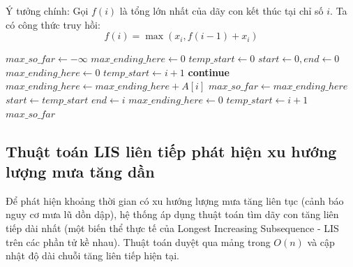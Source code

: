 Ý tưởng chính: Gọi $f(i)$ là tổng lớn nhất của dãy con kết thúc tại chỉ số $i$. Ta có công thức truy hồi:
\begin{equation}
    f(i) = \max(x_i, f(i-1) + x_i)
\end{equation}

\begin{algorithm}[H]
\caption{Thuật toán Kadane tìm đoạn nhiệt độ cao nhất}
\label{alg:kadane}
\begin{algorithmic}[1]
    \State $max\_so\_far \gets -\infty$
    \State $max\_ending\_here \gets 0$
    \State $temp\_start \gets 0$
    \State $start \gets 0, end \gets 0$
            \State $max\_ending\_here \gets 0$
            \State $temp\_start \gets i + 1$
            \State \textbf{continue}
        \EndIf
        \State $max\_ending\_here \gets max\_ending\_here + A[i]$
            \State $max\_so\_far \gets max\_ending\_here$
            \State $start \gets temp\_start$
            \State $end \gets i$
        \EndIf
            \State $max\_ending\_here \gets 0$
            \State $temp\_start \gets i + 1$
        \EndIf
    \EndFor
    \State \Return $max\_so\_far$
\EndProcedure
\end{algorithmic}
\end{algorithm}

\subsection{Thuật toán LIS liên tiếp phát hiện xu hướng lượng mưa tăng dần}
Để phát hiện khoảng thời gian có xu hướng lượng mưa tăng liên tục (cảnh báo nguy cơ mưa lũ dồn dập), hệ thống áp dụng thuật toán tìm dãy con tăng liên tiếp dài nhất (một biến thể thực tế của Longest Increasing Subsequence - LIS trên các phần tử kề nhau).
Thuật toán duyệt qua mảng trong $O(n)$ và cập nhật độ dài chuỗi tăng liên tiếp hiện tại.

